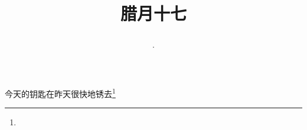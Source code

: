 \title{\date[d=27,m=1,y=2024][year:cn-y,年,month:cn,day:cn,日,·,weekday]·腊月十七 }
今天的钥匙在昨天很快地锈去\footnote{ }

